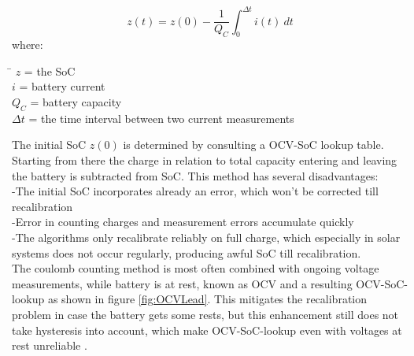 \begin{equation}
z(t) = z(0) - \frac{1}{{Q_{C}}}\int_{0}^{\Delta t} {i(t)\ dt}
\label{equations:CoulombCounting}
\end{equation}
where: 
\begin{tabbing}
\phantom{$v(t)  \  \ \ \ $}\= \kill
$z  $\> = the SoC  \\
$i  $\> = battery current  \\
$Q_{C}$\> =  battery capacity   \\
$\Delta t$\> = the time interval between two current measurements
\end{tabbing}

The initial SoC $z(0)$ is determined by consulting a OCV-SoC lookup table. Starting from there the charge in relation to total capacity entering and leaving the battery is subtracted from SoC. This method has several disadvantages: \\
-The initial SoC incorporates already an error, which won't be corrected till recalibration \\
-Error in counting charges and measurement errors accumulate quickly\\
-The algorithms only recalibrate reliably on full charge, which especially in solar systems does not occur regularly, producing awful SoC till recalibration. \\ %

The coulomb counting method is most often combined with ongoing voltage measurements, while battery is at rest, known as OCV and a resulting OCV-SoC-lookup as shown in figure \ref{fig:OCVLead}. This mitigates the recalibration problem in case the battery gets some rests, but this enhancement still does not take hysteresis into account, which make OCV-SoC-lookup even with voltages at rest unreliable \cite{6861809} \cite{khan2016hysteresis}. %




